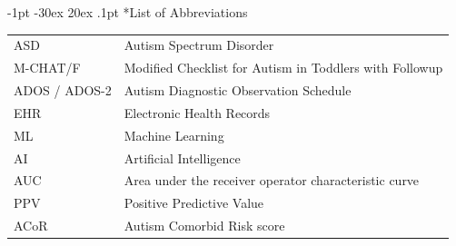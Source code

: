 \documentclass[onecolumn, compsoc,11pt]{IEEEtran}
\makeatletter
\renewcommand\section{\@startsection {section}{1}{\z@}%
                                   {-1pt \@plus -30ex \@minus 20ex}%
                                   {.1pt}%
                                   {\large\bfseries\scshape}}
\renewcommand{\captionN}[1]{\caption{\color{CadetBlue4!80!black} \sffamily \fontsize{9}{10}\selectfont #1  }}
\makeatother
\begin{document}
\clearpage
\section*{List of Abbreviations}
\begin{table}[!ht]
  \hspace{-10pt}
  \begin{tabular}{|R{1.6in}|L{3.55in}|}\hline
   ASD & Autism Spectrum Disorder\\
  M-CHAT/F & Modified Checklist for Autism in Toddlers with Followup\\
  ADOS / ADOS-2 & Autism Diagnostic Observation Schedule \\
  EHR  & Electronic Health Records \\
  ML  & Machine Learning \\
  AI  & Artificial Intelligence \\
    AUC  & Area under the receiver operator characteristic curve \\
        PPV  & Positive Predictive Value \\
  {\color{Red3} ACoR} & {\color{Red3} Autism Comorbid Risk score} \\\hline
  \end{tabular}
  \end{table}
\clearpage
 
{\fontsize{9}{10}\selectfont


}
\end{document}
